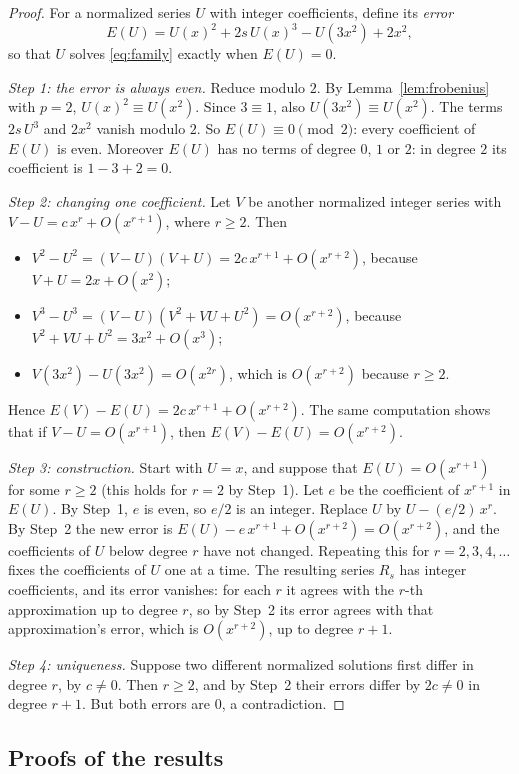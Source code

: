 \documentclass[11pt,a4paper]{article}
\theoremstyle{definition}
\theoremstyle{remark}
\begin{document}
\begin{proof}
For a normalized series $U$ with integer coefficients, define its \emph{error}
\[
E(U)=U(x)^2+2s\,U(x)^3-U(3x^2)+2x^2 ,
\]
so that $U$ solves \eqref{eq:family} exactly when $E(U)=0$.

\emph{Step 1: the error is always even.} Reduce modulo $2$. By Lemma~\ref{lem:frobenius} with $p=2$,
$U(x)^2\equiv U(x^2)$. Since $3\equiv1$, also $U(3x^2)\equiv U(x^2)$. The terms $2s\,U^3$ and $2x^2$ vanish modulo $2$.
So $E(U)\equiv0\pmod2$: every coefficient of $E(U)$ is even. Moreover $E(U)$ has no terms of degree $0$, $1$ or $2$:
in degree $2$ its coefficient is $1-3+2=0$.

\emph{Step 2: changing one coefficient.} Let $V$ be another normalized integer series with
$V-U=c\,x^r+O(x^{r+1})$, where $r\ge2$. Then
\begin{itemize}
\item $V^2-U^2=(V-U)(V+U)=2c\,x^{r+1}+O(x^{r+2})$, because $V+U=2x+O(x^2)$;
\item $V^3-U^3=(V-U)(V^2+VU+U^2)=O(x^{r+2})$, because $V^2+VU+U^2=3x^2+O(x^3)$;
\item $V(3x^2)-U(3x^2)=O(x^{2r})$, which is $O(x^{r+2})$ because $r\ge2$.
\end{itemize}
Hence $E(V)-E(U)=2c\,x^{r+1}+O(x^{r+2})$. The same computation shows that if $V-U=O(x^{r+1})$, then
$E(V)-E(U)=O(x^{r+2})$.

\emph{Step 3: construction.} Start with $U=x$, and suppose that $E(U)=O(x^{r+1})$ for some $r\ge2$ (this holds for
$r=2$ by Step~1). Let $e$ be the coefficient of $x^{r+1}$ in $E(U)$. By Step~1, $e$ is even, so $e/2$ is an integer.
Replace $U$ by $U-(e/2)\,x^r$. By Step~2 the new error is $E(U)-e\,x^{r+1}+O(x^{r+2})=O(x^{r+2})$, and the coefficients
of $U$ below degree $r$ have not changed. Repeating this for $r=2,3,4,\dots$ fixes the coefficients of $U$ one at a
time. The resulting series $R_s$ has integer coefficients, and its error vanishes: for each $r$ it agrees with the
$r$-th approximation up to degree $r$, so by Step~2 its error agrees with that approximation's error, which is
$O(x^{r+2})$, up to degree $r+1$.

\emph{Step 4: uniqueness.} Suppose two different normalized solutions first differ in degree $r$, by $c\ne0$. Then
$r\ge2$, and by Step~2 their errors differ by $2c\ne0$ in degree $r+1$. But both errors are $0$, a contradiction.
\end{proof}

\subsection{Proofs of the results}
\end{document}
